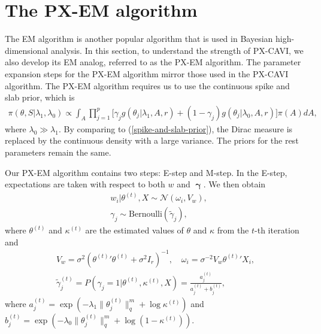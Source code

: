\documentclass[pdftex, noinfoline, letter]{imsart}
\DeclareMathOperator*{\bgamma}{\boldsymbol{\gamma}}
\theoremstyle{plain}
\begin{document}

\section{The PX-EM algorithm}
\label{sec:EM}

The EM algorithm is another popular algorithm that is used in Bayesian high-dimensional analysis.
In this section, to understand the strength of PX-CAVI, we also develop its EM analog, referred to as the PX-EM algorithm. The parameter expansion steps for the PX-EM algorithm mirror those used in the PX-CAVI algorithm.
The PX-EM algorithm requires us to use the continuous spike and slab prior, which is 
\begin{align}
\pi(\theta, S|\lambda_1, \lambda_0) \propto \int_A \prod_{j=1}^p \Big[
\gamma_j g(\theta_j| \lambda_1, A, r) + (1-\gamma_j) g(\theta_j|\lambda_0, A, r)
\Big] \pi(A) dA,
\end{align}
where $\lambda_0 \gg \lambda_1$. 
By comparing to (\ref{spike-and-slab-prior}), the Dirac measure is replaced by the continuous density with a large variance. 
The priors for the rest parameters remain the same.

Our PX-EM algorithm contains two steps: E-step and M-step. In the E-step, expectations are taken with respect to both $w$ and $\bgamma$. We then obtain 
\begin{eqnarray}
\label{eqn:EM-w}
    & w_i|\theta^{(t)}, X \sim \mathcal{N}(\omega_i, V_w), \\
    &\gamma_j \sim {\text{Bernoulli}}(\widetilde \gamma_j),
     \label{eqn:EM-gamma}
\end{eqnarray}
where
$\theta^{(t)}$ and $\kappa^{(t)}$ are the estimated values of $\theta$ and $\kappa$ from the $t$-th iteration
and 
\begin{eqnarray}
\label{eqn:EM-omega-v}
& V_w = \sigma^2 ({\theta^{(t)}}'\theta^{(t)} + \sigma^2 I_r)^{-1}, \quad
\omega_i = \sigma^{-2} V_w {\theta^{(t)}}' X_{i},& \\
\label{eqn:EM-gamma-tilde}
& \widetilde \gamma_j^{(t)} = P(\gamma_j=1|\theta^{(t)}, \kappa^{(t)}, X) = \frac{a_j^{(t)}}{a_j^{(t)}+b_j^{(t)}},& 
\end{eqnarray}
where $a_j^{(t)} = \exp( - \lambda_1 \|\theta^{(t)}_j\|_q^m + \log \kappa^{(t)})$
and 
$b_j^{(t)} = \exp( - \lambda_0 \|\theta^{(t)}_j\|_q^m + \log (1-\kappa^{(t)}))$.
\end{document}
